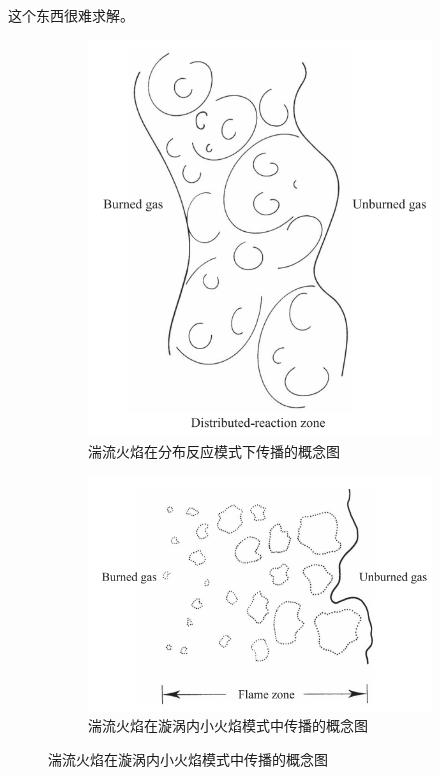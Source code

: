 这个东西很难求解。

\begin{figure}[H]
    \begin{subfigure}[t]{.15\textwidth}
        \includegraphics[width=.99\textwidth]{img/distributed_reaction.png}
        \caption{湍流火焰在分布反应模式下传播的概念图}
    \end{subfigure}
    \begin{subfigure}[t]{.15\textwidth}
        \includegraphics[width=.99\textwidth]{img/flamelet_in_eddies.png}
        \caption{湍流火焰在漩涡内小火焰模式中传播的概念图}
    \end{subfigure}
\end{figure}

